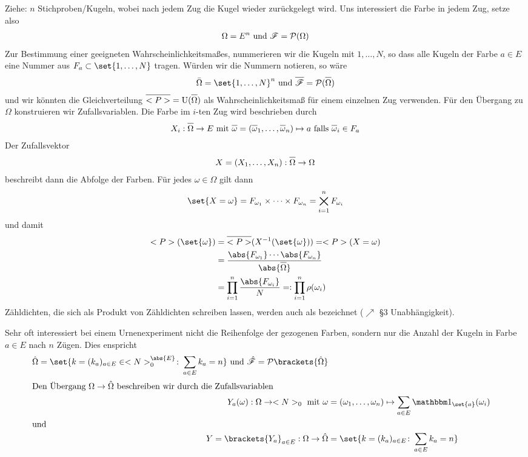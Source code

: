 Ziehe: $n$ Stichproben/Kugeln, wobei nach jedem Zug die Kugel wieder zurückgelegt wird. Uns interessiert die Farbe in jedem Zug, setze also
\begin{align}
	\Omega = E^n \text{ und } \mathscr{F} = \mathcal{P}(\Omega) \notag
\end{align}
Zur Bestimmung einer geeigneten Wahrscheinlichkeitsmaßes, nummerieren wir die Kugeln mit $1,\dots, N$, so dass alle Kugeln der Farbe $a \in E$ eine Nummer aus $F_{a} \subset \set{1,\dots, N}$ tragen. Würden wir die Nummern notieren, so wäre
\begin{align}
	\overline{\Omega} = \set{1,\dots, N}^n \und \overline{\sigF} = \pows(\overline{\Omega})\notag
\end{align}
und wir könnten die Gleichverteilung $\overline{\probp} = \Gleich(\overline{\Omega})$ als Wahrscheinlichkeitsmaß für einem einzelnen Zug verwenden. Für den Übergang zu $\Omega$ konstruieren wir  Zufallsvariablen. Die Farbe im $i$-ten Zug wird beschrieben durch
\begin{align}
	X_i: \overline{\Omega} \to E \mit \overline{\omega} = \left( \overline{\omega}_1, \dots, \overline{\omega}_n \right) \mapsto a \text{ falls } \overline{\omega}_i \in F_a\notag
\end{align}
Der Zufallsvektor
\begin{align}
	X = (X_1, \dots, X_n): \overline{\Omega} \to \Omega\notag
\end{align}
beschreibt dann die Abfolge der Farben. Für jedes $\omega \in \Omega$ gilt dann
\begin{align}
	\set{X = \omega} = F_{\omega_1} \times \cdots \times F_{\omega_n} = \bigtimes_{i=1}^{n} F_{\omega_i}\notag
\end{align}
und damit
\begin{align}
	\probp(\set{\omega}) 
	&= \overline{\probp}(X^{-1}(\set{\omega})) = \probp(X=\omega)\notag\\
	&= \frac{\abs{F_{\omega_1}} \cdots \abs{F_{\omega_n}}}{\abs{\overline{\Omega}}}\notag\\
	&= \prod_{i=1}^{n} \frac{\abs{F_{\omega_i}}}{N} =: \prod_{i=1}^{n} \rho(\omega_i)\notag
\end{align}
Zähldichten, die sich als Produkt von Zähldichten schreiben lassen, werden auch als  bezeichnet ($\nearrow$  \S 3 Unabhängigkeit). %

Sehr oft interessiert bei einem Urnenexperiment nicht die Reihenfolge der gezogenen Farben, sondern nur die Anzahl der Kugeln in Farbe $a \in E$ nach $n$ Zügen. Dies enspricht
\begin{align*}
	\hat{\Omega} 
	= \set{k = (k_a)_{a \in E} \in \N_{0}^{\abs{E}} \colon \sum_{a \in E} k_a = n}
	\und \hat{\sigF} = \pows\brackets{\hat{\Omega}}\\
	\intertext{Den Übergang $\Omega \to \hat{\Omega}$ beschreiben wir durch die Zufallsvariablen}
	Y_a(\omega): \Omega \to \N_{0} \mit \omega &= (\omega_1,\dots, \omega_n)\mapsto \sum_{a \in E} \indi_{\set{a}}(\omega_i)\\
	\intertext{und}
	Y = \brackets{Y_a}_{a\in E}: \Omega \to \hat{\Omega} &= \set{k = (k_a)_{a\in E}\colon \sum_{a \in E} k_a = n}
\end{align*}

